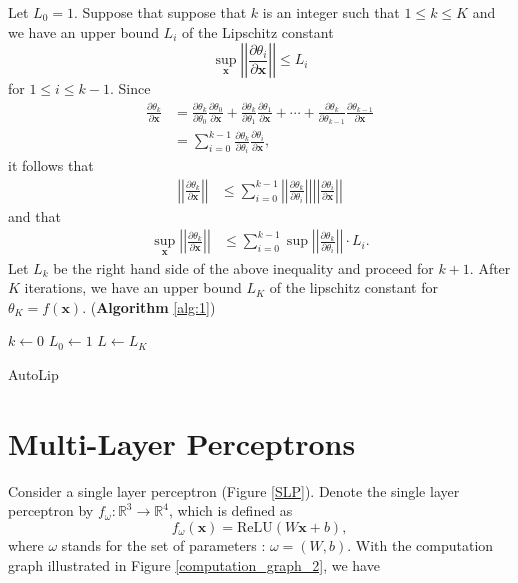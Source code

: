 \documentclass[11pt]{report}
\newcommand\bx{\ensuremath{\boldsymbol x}}
\newcommand\lip{\ensuremath{\text{Lip}}}
\begin{document}
Let \(L_0=1\).
Suppose that suppose that \(k\) is an integer such that \(1\le k\le K\) and we have an upper bound \(L_i\) of the Lipschitz constant
\[\sup_{\boldsymbol x}\left|\left|\frac{\partial\theta_i}{\partial\boldsymbol x}\right|\right|\le L_i\]
for \(1\le i\le k-1\).
Since
\begin{align*}
\frac{\partial \theta_k}{\partial\boldsymbol x}
&=\frac{\partial\theta_k}{\partial\theta_0}\frac{\partial\theta_0}{\partial\boldsymbol x}
+\frac{\partial\theta_k}{\partial\theta_1}\frac{\partial\theta_1}{\partial\boldsymbol x}
+\cdots
+\frac{\partial\theta_k}{\partial\theta_{k-1}}\frac{\partial\theta_{k-1}}{\partial\boldsymbol x}\\
&=\sum_{i=0}^{k-1}\frac{\partial\theta_k}{\partial\theta_i}\frac{\partial\theta_i}{\partial\boldsymbol x},
\end{align*}
it follows that
\begin{align*}
\left|\left|\frac{\partial \theta_k}{\partial\boldsymbol x}\right|\right|
&\le\sum_{i=0}^{k-1}
\left|\left|\frac{\partial\theta_k}{\partial\theta_i}\right|\right|
\left|\left|\frac{\partial\theta_i}{\partial\boldsymbol x}\right|\right|
\end{align*}
and that
\begin{align*}
\sup_{\boldsymbol x}\left|\left|\frac{\partial \theta_k}{\partial\boldsymbol x}\right|\right|
&\le\sum_{i=0}^{k-1}
\sup\left|\left|\frac{\partial\theta_k}{\partial\theta_i}\right|\right|\cdot L_i.
\end{align*}
Let \(L_k\) be the right hand side of the above inequality and proceed for \(k+1\).
After \(K\) iterations, we have an upper bound \(L_K\) of the lipschitz constant for \(\theta_K=f(\boldsymbol x)\).
(\textbf{Algorithm} \ref{alg:1})

\begin{algorithm}
\Output{An upper bound \(L\) for \(\lip(f)\)}
\BlankLine
\(k\gets 0\)\;
\(L_0\gets1\)\;
\(L\gets L_K\)
\caption{AutoLip}
\label{alg:1}
\end{algorithm}

\section{Multi-Layer Perceptrons}
Consider a single layer perceptron (Figure \ref{SLP}).
Denote the single layer perceptron by \(f_\omega:\mathbb R^3\to\mathbb R^4\), which is defined as
\[f_\omega(\bx)=\text{ReLU}(W\bx+b),\]
where \(\omega\) stands for the set of parameters : \(\omega=(W,b)\).
With the computation graph illustrated in Figure \ref{computation_graph_2}, we have
\end{document}
